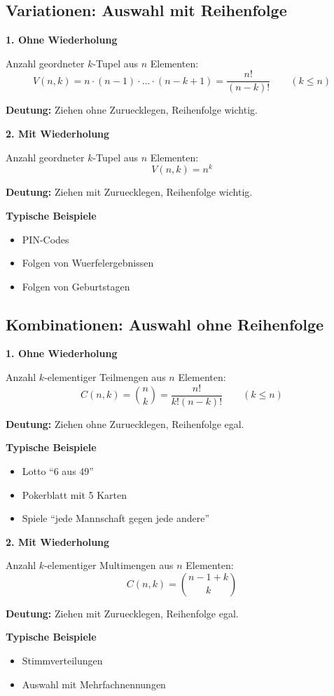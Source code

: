 \documentclass[a4paper,11pt]{article}
\begin{document}
\subsection{Variationen: Auswahl mit Reihenfolge}
\textbf{1. Ohne Wiederholung}

Anzahl geordneter $k$-Tupel aus $n$ Elementen:
\[
V(n,k) = n\cdot(n-1)\cdot \dots \cdot (n-k+1) = \frac{n!}{(n-k)!}
\qquad (k \leq n)
\]

\textbf{Deutung:}
Ziehen ohne Zuruecklegen, Reihenfolge wichtig.

\textbf{2. Mit Wiederholung}

Anzahl geordneter $k$-Tupel aus $n$ Elementen:
\[
V(n,k) = n^k
\]

\textbf{Deutung:}
Ziehen mit Zuruecklegen, Reihenfolge wichtig.

\textbf{Typische Beispiele}
\begin{itemize}
  \item PIN-Codes
  \item Folgen von Wuerfelergebnissen
  \item Folgen von Geburtstagen
\end{itemize}

\subsection{Kombinationen: Auswahl ohne Reihenfolge}
\textbf{1. Ohne Wiederholung}

Anzahl $k$-elementiger Teilmengen aus $n$ Elementen:
\[
C(n,k) = \binom{n}{k} = \frac{n!}{k!(n-k)!}
\qquad (k \leq n)
\]

\textbf{Deutung:}
Ziehen ohne Zuruecklegen, Reihenfolge egal.

\textbf{Typische Beispiele}
\begin{itemize}
  \item Lotto ``6 aus 49''
  \item Pokerblatt mit 5 Karten
  \item Spiele ``jede Mannschaft gegen jede andere''
\end{itemize}

\textbf{2. Mit Wiederholung}

Anzahl $k$-elementiger Multimengen aus $n$ Elementen:
\[
C(n,k) = \binom{n-1+k}{k}
\]

\textbf{Deutung:}
Ziehen mit Zuruecklegen, Reihenfolge egal.

\textbf{Typische Beispiele}
\begin{itemize}
  \item Stimmverteilungen
  \item Auswahl mit Mehrfachnennungen
\end{itemize}
\end{document}
